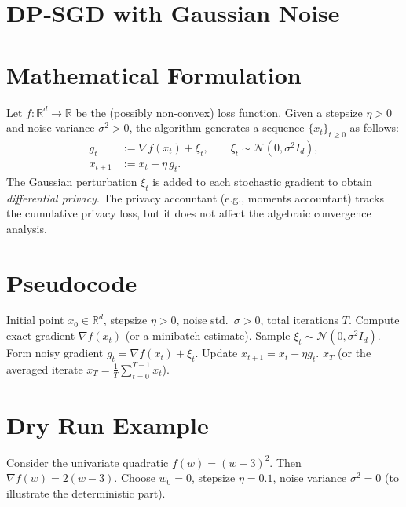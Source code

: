 \documentclass{article}
\newcommand{\R}{\mathbb{R}}
\begin{document}
\section*{DP‑SGD with Gaussian Noise}

\section*{Mathematical Formulation}
Let $f:\R^{d}\rightarrow\R$ be the (possibly non‑convex) loss function.  
Given a stepsize $\eta>0$ and noise variance $\sigma^{2}>0$, the algorithm generates a sequence $\{x_{t}\}_{t\ge 0}$ as follows:
\[
\boxed{
\begin{aligned}
g_{t}      &:= \nabla f(x_{t})+\xi_{t},\qquad \xi_{t}\sim\mathcal{N}(0,\sigma^{2}I_{d}),\\[4pt]
x_{t+1}    &:= x_{t}-\eta\, g_{t}.
\end{aligned}}
\tag{1}
\]
The Gaussian perturbation $\xi_{t}$ is added to each stochastic gradient to obtain \emph{differential privacy}.  
The privacy accountant (e.g., moments accountant) tracks the cumulative privacy loss, but it does not affect the algebraic convergence analysis.

\section*{Pseudocode}
\begin{algorithm}[H]
\caption{DP‑SGD with Gaussian Noise}
\begin{algorithmic}[1]
\REQUIRE Initial point $x_{0}\in\R^{d}$, stepsize $\eta>0$, noise std.~$\sigma>0$, total iterations $T$.
    \STATE Compute exact gradient $\nabla f(x_{t})$ (or a minibatch estimate).
    \STATE Sample $\xi_{t}\sim\mathcal{N}(0,\sigma^{2}I_{d})$.
    \STATE Form noisy gradient $g_{t}= \nabla f(x_{t})+\xi_{t}$.
    \STATE Update $x_{t+1}=x_{t}-\eta g_{t}$.
\ENDFOR
\RETURN $x_{T}$ (or the averaged iterate $\bar x_{T}= \frac1T\sum_{t=0}^{T-1}x_{t}$).
\end{algorithmic}
\end{algorithm}

\section*{Dry Run Example}
Consider the univariate quadratic $f(w)=(w-3)^{2}$.  
Then $\nabla f(w)=2(w-3)$.  Choose $w_{0}=0$, stepsize $\eta=0.1$, noise variance $\sigma^{2}=0$ (to illustrate the deterministic part).  
\end{document}
